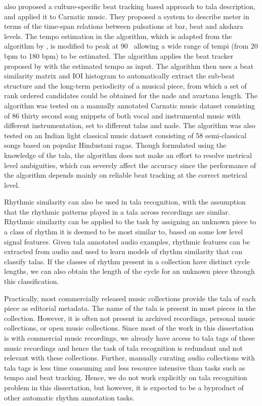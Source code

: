  also proposed a culture-specific beat tracking based approach to \gls{tala} description, and applied it to Carnatic music. They proposed a system to describe meter in terms of the time-span relations between pulsations at bar, beat and \gls{akshara} levels. The tempo estimation in the algorithm, which is adapted from the algorithm by , is modified to peak at 90 \bpm\, allowing a wide range of tempi (from 20 bpm to 180 bpm) to be estimated. The algorithm applies the beat tracker proposed by  with the estimated tempo as input. The algorithm then uses a beat similarity matrix and \gls{IOI} histogram to automatically extract the sub-beat structure and the long-term periodicity of a musical piece, from which a set of rank ordered candidates could be obtained for the \gls{nade} and \gls{avartana} length. The algorithm was tested on a manually annotated Carnatic music dataset consisting of 86 thirty second song snippets of both vocal and instrumental music with different instrumentation, set to different \glspl{tala} and \gls{nade}. The algorithm was also tested on an Indian light classical music dataset consisting of 58 semi-classical songs based on popular Hindustani \glspl{raga}. Though formulated using the knowledge of the \gls{tala}, the algorithm does not make an effort to resolve metrical level ambiguities, which can severely affect the accuracy since the performance of the algorithm depends mainly on reliable beat tracking at the correct metrical level.

Rhythmic similarity can also be used in \gls{tala} recognition, with the assumption that the rhythmic patterns played in a \gls{tala} across recordings are similar. Rhythmic similarity can be applied to the task by assigning an unknown piece to a class of rhythm it is deemed to be most similar to, based on some low level signal features. Given \gls{tala} annotated audio examples, rhythmic features can be extracted from audio and used to learn models of rhythm similarity that can classify \glspl{tala}. If the classes of rhythm present in a collection have distinct cycle lengths, we can also obtain the length of the cycle for an unknown piece through this classification. 

Practically, most commercially released music collections provide the \gls{tala} of each piece as editorial metadata. The name of the \gls{tala} is present in most pieces in the collection. However, it is often not present in archived recordings, personal music collections, or open music collections. Since most of the work in this dissertation is with commercial music recordings, we already have access to \gls{tala} tags of these music recordings and hence the task of \gls{tala} recognition is redundant and not relevant with these collections. Further, manually curating audio collections with \gls{tala} tags is less time consuming and less resource intensive than tasks such as tempo and beat tracking. Hence, we do not work explicitly on \gls{tala} recognition problem in this dissertation, but however, it is expected to be a byproduct of other automatic rhythm annotation tasks.
%
